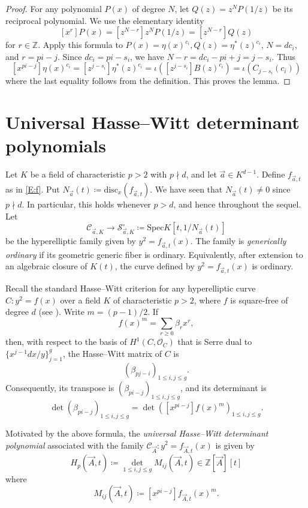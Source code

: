 \documentclass{amsart}
\theoremstyle{plain}
\theoremstyle{remark}
\newcommand{\cS}{\mathcal{S}}
\newcommand{\cO}{\mathcal{O}}
\newcommand{\cC}{\mathcal{C}}
\newcommand{\Spec}{\mathrm{Spec}}
\newcommand{\disc}{\mathrm{disc}}
\newcommand{\1}{\mathbf{1}}
\newcommand{\Z}{\mathbb{Z}}
\newcommand{\va}{{\vec{a}}}
\newcommand{\vA}{{\vec{A}}}
\begin{document}
\begin{proof}
For any polynomial $P(x)$ of degree $N$,
let $Q(z)=z^NP(1/z)$ be its reciprocal polynomial.
We use the elementary identity
\[
[x^r]P(x)=[z^{N-r}]z^N P(1/z)=[z^{N-r}]Q(z)
\]
for $r\in\Z$.
Apply this formula to $P(x)=\eta(x)^{c_i}, Q(z)=\eta^*(z)^{c_i}$, $N=dc_i$, and $r=pi-j$.
Since $dc_i=pi-s_i$, we have $N-r=dc_i-pi+j=j-s_i$. Thus
\[
[x^{pi-j}]\eta(x)^{c_i} = [z^{j-s_i}]\eta^*(z)^{c_i}
=\iota([z^{j-s_i}]B(z)^{c_i})=\iota\left( C_{j-s_i}(c_i)\right)
\]
where the last equality follows from the definition. This proves the lemma.
\end{proof}


\section{Universal Hasse--Witt determinant polynomials}
\label{S:4}


Let $K$ be a field of characteristic $p>2$ with $p\nmid d$,
and let $\va\in K^{d-1}$.
Define $f_{\va,t}$ as in
\eqref{E:f}. Put
$N_\va(t)\coloneqq\disc_x(f_{\va,t})$. We have seen that $N_\va(t)\ne 0$ since
$p\nmid d$. In particular, this holds whenever $p>d$, and hence throughout the sequel.
Let
\[
\cC_{\va,K}\longrightarrow \cS_{\va,K}^\circ\coloneqq\Spec K[t,1/N_{\va}(t)]
\]
be the hyperelliptic family given by $y^2=f_{\va,t}(x)$.
The family is \emph{generically ordinary}
if its geometric generic fiber is ordinary.
Equivalently, after extension to an algebraic closure of
$K(t)$, the curve defined by $y^2=f_{\va,t}(x)$ is ordinary.

Recall the standard
Hasse--Witt criterion for any
hyperelliptic curve
$C: y^2=f(x)$
over a field $K$ of characteristic $p>2$,
where $f$ is square-free of degree $d$ (see \cite{Has37, Man65}).
Write $m=(p-1)/2$.
If
\[
f(x)^m=\sum_{r\ge 0} \beta_r x^r,
\]
then, with respect to the basis of $H^1(C,\cO_C)$ that is Serre dual to
$\{x^{j-1}dx/y\}_{j=1}^g$, the Hasse--Witt matrix of $C$ is
\[
(\beta_{pj-i})_{1\le i,j\le g}.
\]
Consequently, its transpose is $(\beta_{pi-j})_{1\le i,j\le g}$, and its
determinant is
\[
\det(\beta_{pi-j})_{1\le i,j\le g}
=\det([x^{pi-j}]f(x)^m)_{1\le i,j\le g}.
\]

Motivated by the above formula,
the
\emph{universal Hasse--Witt determinant polynomial} associated with the family
$\cC_\vA: y^2=f_{\vA,t}(x)$ is given by
\begin{equation*}
\boxed{
H_p(\vA,t) \coloneqq \det_{1\le i,j\le g} M_{ij}(\vA,t)\in \Z[\vA][t]}
\end{equation*}
where
\[
M_{ij}(\vA,t)\coloneqq [x^{pi-j}]f_{\vA,t}(x)^m.
\]
\end{document}

